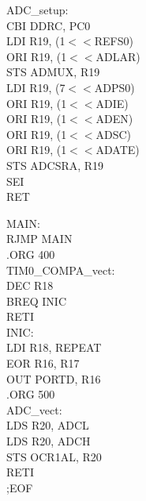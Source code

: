 \documentclass[titlepage, a4paper, 10pt, reqno, openany]{report}
\begin{document}
\begin{minipage}[t]{.45\linewidth}
ADC\_setup: \\
\hspace*{.5cm}	CBI DDRC, PC0 \\
\hspace*{.5cm}	LDI R19, (1$<<$REFS0) \\
\hspace*{.5cm}	ORI R19, (1$<<$ADLAR) \\
\hspace*{.5cm}	STS ADMUX, R19 \\
\hspace*{.5cm}	LDI R19, (7$<<$ADPS0) \\
\hspace*{.5cm}	ORI R19, (1$<<$ADIE) \\
\hspace*{.5cm}	ORI R19, (1$<<$ADEN) \\
\hspace*{.5cm}	ORI R19, (1$<<$ADSC) \\
\hspace*{.5cm}	ORI R19, (1$<<$ADATE) \\
\hspace*{.5cm}	STS ADCSRA, R19 \\
\hspace*{.5cm}	SEI \\
\hspace*{.5cm}	RET
\end{minipage}
\vline \quad
\begin{minipage}[t]{.45\linewidth}
\scriptsize
MAIN: \\
\hspace*{.5cm}	RJMP MAIN \\
\newline
.ORG 400 \\
TIM0\_COMPA\_vect: \\
\hspace*{.5cm}	DEC R18 \\
\hspace*{.5cm}	BREQ INIC \\
\hspace*{.5cm}	RETI \\
INIC: \\
\hspace*{.5cm}	LDI R18, REPEAT \\
\hspace*{.5cm}	EOR R16, R17 \\
\hspace*{.5cm}	OUT PORTD, R16 \\
\newline
.ORG 500 \\
ADC\_vect: \\
\hspace*{.5cm}	LDS R20, ADCL \\
\hspace*{.5cm}	LDS R20, ADCH \\
\hspace*{.5cm}	STS OCR1AL, R20 \\
\hspace*{.5cm}	RETI \\
;EOF
\end{minipage} \par
\end{document}

